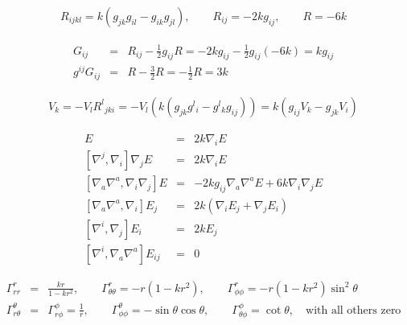 \documentclass[10pt,letterpaper]{article}
\numberwithin{equation}{section}
\begin{document}
\begin{appendices}
\begin{eqnarray}
R_{ijkl} = k(g_{jk}g_{il}-g_{ik}g_{jl}),\qquad R_{ij} = -2kg_{ij},\qquad R = -6k
\end{eqnarray}

\begin{eqnarray}
G_{ij} &=& R_{ij} - \frac12 g_{ij} R = -2k g_{ij} -\frac12 g_{ij}(-6k) =k g_{ij}
\nonumber\\{}
g^{ij}G_{ij} &=& R-\frac32 R = -\frac12 R = 3k
\end{eqnarray}

\begin{eqnarray}
[\nabla_i,\nabla_j]V_k =- V_l R^l{}_{jki}= -V_l ( k(g_{jk}g^{l}{}_i - g^l{}_k g_{ij})) = k(g_{ij} V_k - g_{jk}V_i)
\label{covcom}
\end{eqnarray}

\begin{eqnarray}
[\nabla_a \nabla^a ,\nabla_i] E &=& 2k\nabla_i E
\nonumber\\{}
[\nabla^j,\nabla_i]\nabla_j E &=& 2k\nabla_i E
\nonumber\\{}
 [\nabla_a\nabla^a,\nabla_i\nabla_j]E &=& -2kg_{ij}\nabla_a\nabla^a E + 6k\nabla_i\nabla_j E
\nonumber\\{}
[\nabla_a \nabla^a, \nabla_i] E_j &=& 2k(\nabla_i E_j + \nabla_j E_i)
\nonumber\\{}
[\nabla^i,\nabla_j]E_i &=& 2kE_j
\nonumber\\{}
[\nabla^i,\nabla_a\nabla^a]E_{ij} &=& 0
\end{eqnarray}

\begin{eqnarray}
\Gamma^r_{rr} &=& \frac{kr}{1-kr^2},\qquad \Gamma^r_{\theta\theta} = -r(1-kr^2),\qquad \Gamma^r_{\phi\phi} = -r(1-kr^2)\sin^2\theta
\nonumber\\
\Gamma^\theta_{r\theta} &=& \Gamma^{\phi}_{r\phi} = \frac{1}{r},\qquad \Gamma^{\theta}_{\phi\phi} = -\sin\theta\cos\theta, \qquad \Gamma^{\phi}_{\theta\phi} = \cot\theta,\quad\text{with all others zero}
\end{eqnarray}

\end{appendices}
\newpage
\printbibliography
\end{document}
